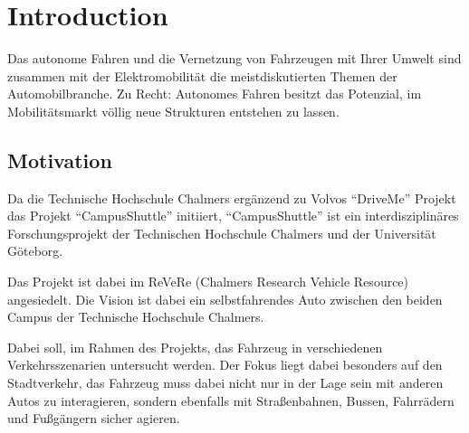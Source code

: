 \chapter{Introduction}

Das autonome Fahren und die Vernetzung von Fahrzeugen mit Ihrer Umwelt sind zusammen mit der Elektromobilität die meistdiskutierten Themen der Automobilbranche.
Zu Recht: Autonomes Fahren besitzt das Potenzial, im Mobilitätsmarkt völlig neue Strukturen entstehen zu lassen.

\section{Motivation}

Da die Technische Hochschule Chalmers ergänzend zu Volvos “DriveMe” Projekt das Projekt
“CampusShuttle” initiiert, “CampusShuttle” ist ein interdisziplinäres Forschungsprojekt
der Technischen Hochschule Chalmers und der Universität Göteborg.

Das Projekt ist dabei im ReVeRe (Chalmers Research Vehicle Resource) angesiedelt. Die Vision ist dabei ein selbstfahrendes
Auto zwischen den beiden Campus der Technische Hochschule Chalmers.

Dabei soll, im Rahmen des Projekts, das Fahrzeug in verschiedenen Verkehrsszenarien untersucht
werden. Der Fokus liegt dabei besonders auf den Stadtverkehr, das Fahrzeug muss dabei nicht
nur in der Lage sein mit anderen Autos zu interagieren, sondern ebenfalls mit Straßenbahnen,
Bussen, Fahrrädern und Fußgängern sicher agieren. 